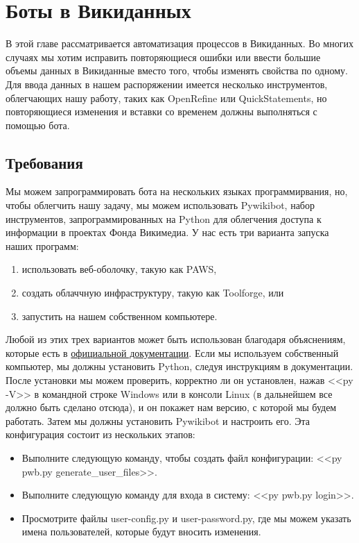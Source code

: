 \chapter{Боты в Викиданных}
\label{ch:bots}
В этой главе рассматривается автоматизация процессов в Викиданных. Во многих случаях мы хотим исправить повторяющиеся ошибки или ввести большие объемы данных в Викиданные вместо того, чтобы изменять свойства по одному. Для ввода данных в нашем распоряжении имеется несколько инструментов, облегчающих нашу работу, таких как OpenRefine или QuickStatements, но повторяющиеся изменения и вставки со временем должны выполняться с помощью бота.


\section{Требования}
\label{sec:requirements}
Мы можем запрограммировать бота на нескольких языках программирвания, но, чтобы облегчить нашу задачу, мы можем использовать Pywikibot, набор инструментов, запрограммированных на Python для облегчения доступа к информации в проектах Фонда Викимедиа. У нас есть три варианта запуска наших программ:
\begin{enumerate}
  \setlength{\itemindent}{2em}
  \item использовать веб-оболочку, такую как PAWS,
  \item создать облаччную инфраструктуру, такую как Toolforge, или 
  \item запустить на нашем собственном компьютере.
\end{enumerate}

Любой из этих трех вариантов может быть использован благодаря объяснениям, которые есть в \href{https://www.mediawiki.org/wiki/Manual:Pywikibot/Installation}{\color{blue}официальной документации}. Если мы используем собственный компьютер, мы должны установить Python, следуя инструкциям в документации. После установки мы можем проверить, корректно ли он установлен, нажав <<py -V>> в командной строке Windows или в консоли Linux (в дальнейшем все должно быть сделано отсюда), и он покажет нам версию, с которой мы будем работать. Затем мы должны установить Pywikibot и настроить его. Эта конфигурация состоит из нескольких этапов:
\begin{itemize}
  \setlength{\itemindent}{2em}
  \item Выполните следующую команду, чтобы создать файл конфигурации: <<py pwb.py generate\_user\_files>>.
  \item Выполните следующую команду для входа в систему: <<py pwb.py login>>.
  \item Просмотрите файлы user-config.py и user-password.py, где мы можем указать имена пользователей, которые будут вносить изменения.
\end{itemize}

